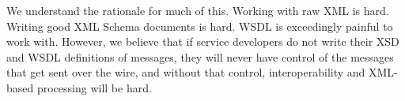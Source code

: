 We understand the rationale for much of this. Working with raw XML is
hard.  Writing good XML Schema documents is hard. WSDL is exceedingly
painful to work with. However, we believe that if service developers do not write
their XSD and WSDL definitions of messages, they will never have
control of the messages that get sent over the wire, and without that
control, interoperability and XML-based processing will be hard.

